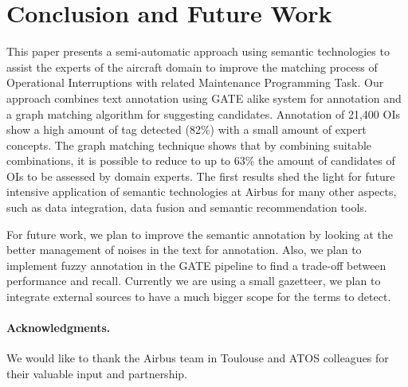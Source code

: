 \documentclass[a4paper,english,submission]{rnti}  %
\begin{document}
\section{Conclusion and Future Work}
\label{sec:conclusion}
This paper presents a semi-automatic approach using semantic technologies to assist the experts of the aircraft domain to improve the matching process of Operational Interruptions with related Maintenance Programming Task. Our approach combines text annotation using GATE alike system for annotation and a graph matching algorithm for suggesting candidates. Annotation of 21,400 OIs show a high amount of tag detected (82\%) with a small amount of expert concepts. The graph matching technique shows that by combining suitable combinations, it is possible to reduce to up to 63\% the amount of candidates of OIs to be assessed by domain experts. The first results shed the light for future intensive application of semantic technologies at Airbus for many other aspects, such as data integration, data fusion and semantic recommendation tools. 

For future work, we plan to improve the semantic annotation by looking at the better management of noises in the text for annotation. Also, we plan to implement fuzzy annotation in the GATE pipeline to find a trade-off between performance and recall. Currently we are using a small gazetteer, we plan to integrate external sources to have a much bigger scope for the terms to detect.  




\paragraph{\textbf{Acknowledgments.}} %
We would like to thank the Airbus team in Toulouse and ATOS colleagues for their valuable input and partnership.







\Fr
\end{document}
